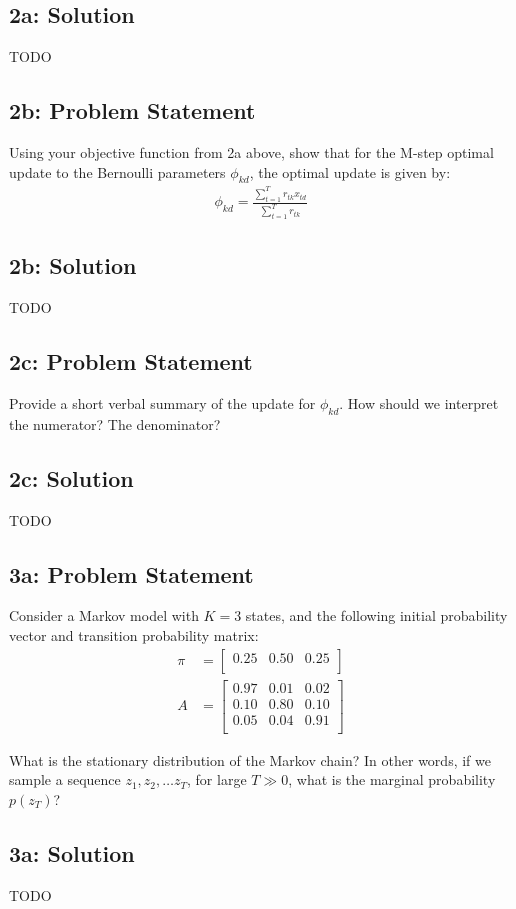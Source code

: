 \documentclass[10pt]{article}
\newcommand{\officialdirections}[1]{{\color{blue} #1}}
\begin{document}
\subsection{2a: Solution}

TODO


\newpage
\officialdirections{
\subsection*{2b: Problem Statement}
Using your objective function from 2a above, show that for the M-step optimal update to the Bernoulli parameters $\phi_{kd}$, the optimal update is given by:
\begin{align}
\phi_{kd} = \frac{ \sum_{t=1}^T r_{tk} x_{td} }{ \sum_{t=1}^T r_{tk} }
\end{align}
}

\subsection{2b: Solution}

TODO


\officialdirections{
\subsection*{2c: Problem Statement}
Provide a short verbal summary of the update for $\phi_{kd}$. How should we interpret the numerator? The denominator?
}

\subsection{2c: Solution}

TODO



\officialdirections{
\subsection*{3a: Problem Statement}
Consider a Markov model with $K=3$ states, and the following initial probability vector and transition probability matrix:
\begin{align}
  \pi &=
  \left[ {\begin{array}{ccc}
   0.25 & 0.50 & 0.25 \\
  \end{array} } \right]
\\
  A &=
  \left[ {\begin{array}{ccc}
   0.97 & 0.01 & 0.02 \\
   0.10 & 0.80 & 0.10 \\
   0.05 & 0.04 & 0.91 \\
  \end{array} } \right]
\end{align}

What is the stationary distribution of the Markov chain?
In other words, if we sample a sequence $z_1, z_2, \ldots z_T$, for large $T \gg 0$, what is the marginal probability $p(z_T)$? 

}

\subsection{3a: Solution}

TODO
\end{document}
